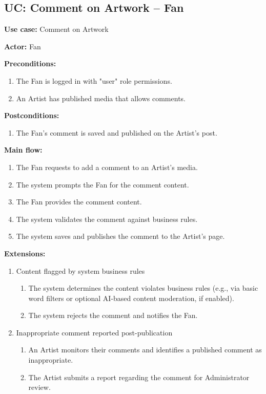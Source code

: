 \documentclass[11pt]{report}
\begin{document}
\subsection{UC: Comment on Artwork -- Fan}

{\bfseries Use case:} Comment on Artwork

{\bfseries Actor:} Fan

{\bfseries Preconditions:}
\begin{enumerate}
	\item The Fan is logged in with "user" role permissions.
	\item An Artist has published media that allows comments.
\end{enumerate}

{\bfseries Postconditions:}
\begin{enumerate}
	\item The Fan's comment is saved and published on the Artist's post.
\end{enumerate}

{\bfseries Main flow:}
\begin{enumerate}
	\item The Fan requests to add a comment to an Artist's media.
	\item The system prompts the Fan for the comment content.
	\item The Fan provides the comment content.
	\item The system validates the comment against business rules.
	\item The system saves and publishes the comment to the Artist's page.
\end{enumerate}

{\bfseries Extensions:}
\begin{enumerate}
	\item [4a.] Content flagged by system business rules
	\begin{enumerate}
		\item [4a1.] The system determines the content violates business rules (e.g., via basic word filters or optional AI-based content moderation, if enabled).
		\item [4a2.] The system rejects the comment and notifies the Fan.
	\end{enumerate}
	\item [5a.] Inappropriate comment reported post-publication
	\begin{enumerate}
		\item [5a1.] An Artist monitors their comments and identifies a published comment as inappropriate.
		\item [5a2.] The Artist submits a report regarding the comment for Administrator review.
	\end{enumerate}
\end{enumerate}
\end{document}
